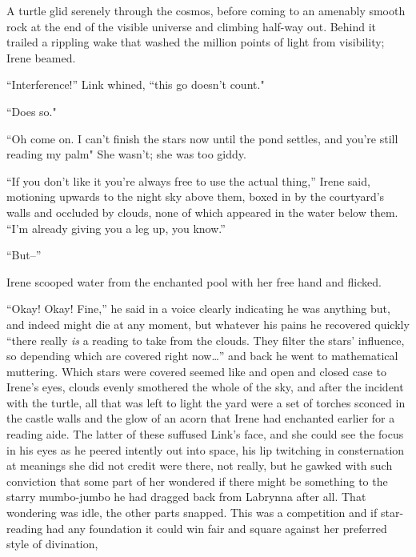 \documentclass[../FGP.tex]{subfiles}
\begin{document}
A turtle glid serenely through the cosmos, before coming to an amenably smooth rock at the end of the visible universe and climbing half-way out. Behind it trailed a rippling wake that washed the million points of light from visibility; Irene beamed.

\normalmarginpar``Interference!'' Link whined, ``this go doesn't count."  

``Does so." 

``Oh come on. I can't finish the stars now until the pond settles, and you're still reading my palm" She wasn't; she was too giddy.

``If you don't like it you're always free to use the actual thing,'' Irene said, motioning upwards to the night sky above them, boxed in by the courtyard's walls and occluded by clouds, none of which appeared in the water below them. ``I'm already giving you a leg up, you know.''

``But--'' 

Irene scooped water from the enchanted pool with her free hand and flicked. 

``Okay! Okay! Fine,'' he said in a voice clearly indicating he was anything but, and indeed might die at any moment, but whatever his pains he recovered quickly ``there really \emph{is} a reading to take from the clouds. They filter the stars' influence, so depending which are covered right now\ldots'' and back he went to mathematical muttering. Which stars were covered seemed like and open and closed case to Irene's eyes, clouds evenly smothered the whole of the sky, and after the incident with the turtle, all that was left to light the yard were a set of torches sconced in the castle walls and the glow of an acorn that Irene had enchanted earlier for a reading aide. The latter of these suffused Link's face, and she could see the focus in his eyes as he peered intently out into space, his lip twitching in consternation at meanings she did not credit were there, not really, but he gawked with such conviction that some part of her wondered if there might be something to the starry mumbo-jumbo he had dragged back from Labrynna after all.%
That wondering was idle, the other parts snapped. This was a competition and if star-reading had any foundation it could win fair and square against her preferred style of divination,%
 
\end{document}
